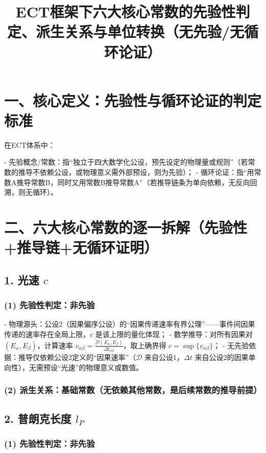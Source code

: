 \documentclass{article}
\title{ECT框架下六大核心常数的先验性判定、派生关系与单位转换（无先验/无循环论证）}
\author{}
\date{}
\begin{document}
\maketitle

\section*{一、核心定义：先验性与循环论证的判定标准}

在ECT体系中：

- 先验概念/常数：指“独立于四大数学化公设，预先设定的物理量或规则”（若常数的推导不依赖公设，或物理意义需外部预设，则为先验）；
- 循环论证：指“用常数A推导常数B，同时又用常数B推导常数A”（若推导链条为单向依赖，无反向回溯，则无循环）。

\section*{二、六大核心常数的逐一拆解（先验性+推导链+无循环证明）}

\subsection*{1. 光速 \( c \)}

\subsubsection*{(1) 先验性判定：非先验}

- 物理源头：公设2（因果偏序公设）的“因果传递速率有界公理”——事件间因果传递的速率存在全局上限，\( c \) 是该上限的量化体现；
- 数学推导：对所有因果对 \( (E_\alpha,E_\beta) \)，计算速率 \( v_{\alpha\beta} = \frac{\mathcal{D}(E_\alpha,E_\beta)}{\Delta t_{\alpha\beta}} \)，取上确界得 \( c = \sup\{v_{\alpha\beta}\} \)；
- 无先验依据：推导仅依赖公设2定义的“因果速率”（\( \mathcal{D} \) 来自公设1，\( \Delta t \) 来自公设2的因果单向性），无需预设“光速”的物理意义或数值。

\subsubsection*{(2) 派生关系：基础常数（无依赖其他常数，是后续常数的推导前提）}

\subsection*{2. 普朗克长度 \( l_P \)}

\subsubsection*{(1) 先验性判定：非先验}
\end{document}

